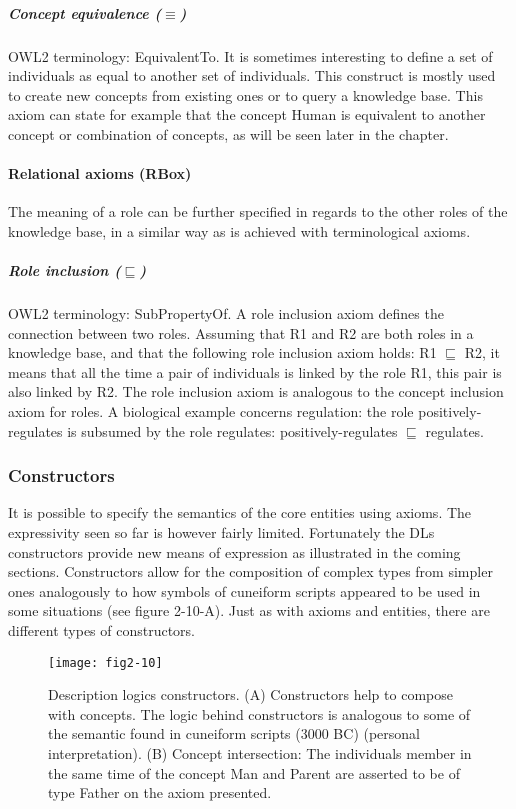 \subparagraph{Concept equivalence ($ \equiv $)\\}
OWL2 terminology: EquivalentTo. It is sometimes interesting to define a set of individuals as equal to another set of individuals. This construct is mostly used to create new concepts from existing ones or to query a knowledge base. This axiom can state for example that the concept Human is equivalent to another concept or combination of concepts, as will be seen later in the chapter.

\paragraph{\textbf{Relational axioms (RBox)}\\}

The meaning of a role can be further specified in regards to the other roles of the knowledge base, in a similar way as is achieved with terminological axioms.

\subparagraph{Role inclusion ($ \sqsubseteq $)\\}
OWL2 terminology: SubPropertyOf. A role inclusion axiom defines the connection between two roles. Assuming that R1 and R2 are both roles in a knowledge base, and that the following role inclusion axiom holds: R1 $ \sqsubseteq $ R2, it means that all the time a pair of individuals is linked by the role R1, this pair is also linked by R2. The role inclusion axiom is analogous to the concept inclusion axiom for roles. A biological example concerns regulation: the role positively-regulates is subsumed by the role regulates: positively-regulates $ \sqsubseteq $ regulates.

\subsubsection{Constructors}

It is possible to specify the semantics of the core entities using axioms. The expressivity seen so far is however fairly limited. Fortunately the DLs constructors provide new means of expression as illustrated in the coming sections. Constructors allow for the composition of complex types from simpler ones analogously to how symbols of cuneiform scripts appeared to be used in some situations (see figure 2-10-A). Just as with axioms and entities, there are different types of constructors.

\begin{figure}[ht]
    \centering
    \texttt{[image: fig2-10]}
    \caption{Description logics constructors. (A) Constructors help to compose with concepts. The logic behind constructors is analogous to some of the semantic found in cuneiform scripts (3000 BC) (personal interpretation). (B) Concept intersection: The individuals member in the same time of the concept Man and Parent are asserted to be of type Father on the axiom presented.}
    \label{fig2-10}
\end{figure}

